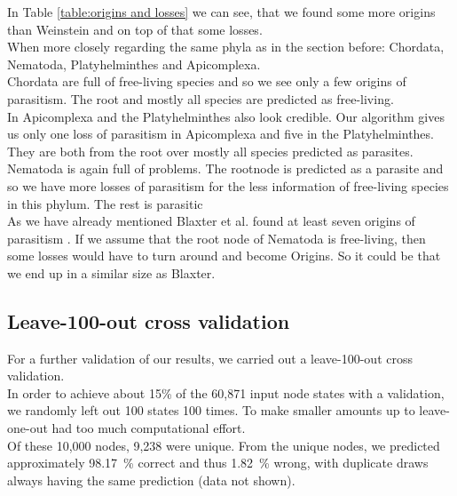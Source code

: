         In Table \ref{table:origins and losses} we can see, that we found some more origins than Weinstein 
          and on top of that some losses. \\

        When more closely regarding the same phyla as in the section before: Chordata, Nematoda, 
          Platyhelminthes and Apicomplexa. \\
        Chordata are full of free-living species and so we see only a few origins of parasitism. The root
        and mostly all species are predicted as free-living. \\
        In Apicomplexa and the Platyhelminthes also look credible. Our algorithm gives us only one loss of
          parasitism in Apicomplexa and five in the Platyhelminthes. They are both from the root over
          mostly all species predicted as parasites. \\
        Nematoda is again full of problems. The rootnode is predicted as a parasite and so we have more 
          losses of parasitism for the less information of free-living species in this phylum. The rest 
          is parasitic \\
        As we have already mentioned Blaxter et al. found at least seven origins of parasitism 
          \cite{Blaxter1998}. If we assume that the root node of Nematoda is free-living, then some 
          losses would have to turn around and become Origins. So it could be that we end up in a similar 
          size as Blaxter.
      
    \subsection{Leave-100-out cross validation} \label{sec:results - cross validation}
      For a further validation of our results, we carried out a leave-100-out cross validation. \\
      In order to achieve about 15\% of the 60,871 input node states with a validation, 
        we randomly left out 100 states 100 times. To make smaller amounts up to leave-one-out had too 
        much computational effort. \\
        
      Of these 10,000 nodes, 9,238 were unique. From the unique nodes, we predicted approximately 
        98.17~\% correct and thus 1.82~\% wrong, with duplicate draws always having the same prediction 
        (data not shown). \\
      
